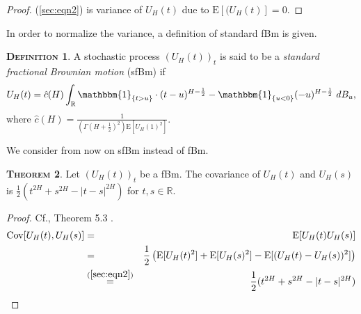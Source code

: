 \documentclass[a4paper, twoside, 11pt]{article}
\theoremstyle{definition}
\newtheorem{definition}{\scshape Definition}[section]
\newtheorem{theorem}[definition]{\scshape Theorem}
\newcommand{\brkt}[1]{\left({#1} \right)}
\begin{document}
\begin{proof}
	(\ref{sec:eqn2}) is variance of $U_H(t)$ due to $\mathrm{E}[(U_H(t)] = 0$.
  \end{proof}
  In order to normalize the variance, a definition of standard fBm is given.

  \begin{definition}
	A stochastic process $(U_H(t))_{t}$ is said to be a \emph{standard fractional Brownian motion} (sfBm) if
	\begin{equation}
  U_H(t) = \hat{c}(H) \int_{\mathbb{R}} \mathbbm{1}_{\{t> u\}}\cdot (t-u)^{H-\frac{1}{2}} - \mathbbm{1}_{\{u< 0\}} (-u)^{H-\frac{1}{2}} \, \mathop{dB_u},
  \label{sec:eqn3}
  \end{equation}
  where $\hat{c}(H) = \frac{1}{(\Gamma(H+\frac{1}{2})^2)\mathrm{E}[U_H(1)^2]} $.
  \end{definition}
  We consider from now on sfBm instead of fBm.

  \begin{theorem}
	Let  $(U_H(t))_{t}$ be a fBm. The covariance of $U_H(t)$ and $U_H(s)$ is $ \frac{1}{2}(t^{2H} + s^{2H} - |t-s|^{2H})$ for $t, s \in \mathbb{R}$.
  \end{theorem}

  \begin{proof}
	Cf.\cite{mandelbrot}, Theorem 5.3 .
	\begin{eqnarray}
	  \mathrm{Cov}[U_H(t), U_H(s)] &=& \mathrm{E}[U_H(t)U_H(s)] \nonumber\\
	  &=& \frac{1}{2}\brkt{\mathrm{E}[U_H(t)^2] + \mathrm{E}[U_H(s)^2] - \mathrm{E}[(U_H(t) - U_H(s))^2]} \nonumber\\
	  &\overset{(\ref{sec:eqn2})}{=}& \frac{1}{2}(t^{2H} + s^{2H} - |t-s|^{2H})
	  \label{sec:eqn4}
	\end{eqnarray}
  \end{proof}
\end{document}
